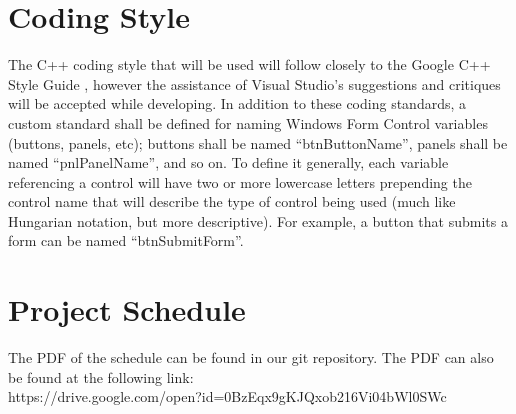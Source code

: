 \documentclass{article}
\begin{document}
\section{Coding Style}
The C++ coding style that will be used will follow closely to the Google C++ Style Guide \cite{C++guide}, however the assistance of Visual Studio’s suggestions and critiques will be accepted while developing. In addition to these coding standards, a custom standard shall be defined for naming Windows Form Control variables (buttons, panels, etc); buttons shall be named “btnButtonName”, panels shall be named “pnlPanelName”, and so on. To define it generally, each variable referencing a control will have two or more lowercase letters prepending the control name that will describe the type of control being used (much like Hungarian notation, but more descriptive). For example, a button that submits a form can be named “btnSubmitForm”.

\section{Project Schedule}
The PDF of the schedule can be found in our git repository. The PDF can also be found at the following link:\\
https://drive.google.com/open?id=0BzEqx9gKJQxob216Vi04bWl0SWc 



\end{document}
